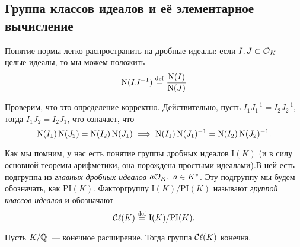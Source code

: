 	\subsection{Группа классов идеалов и её элементарное вычисление}

	Понятие нормы легко распространить на дробные идеалы: если $I, J \subset \mathcal{O}_{K}$~--- целые идеалы, то мы можем положить 
	\[
		\operatorname{\mathrm{N}}(I J^{-1}) \stackrel{\mathrm{def}}{=} \frac{\operatorname{\mathrm{N}}(I)}{\operatorname{\mathrm{N}}(J)} 
	\]

	Проверим, что это определение корректно. Действительно, пусть $I_1 J_1^{-1} = I_{2} J_{2}^{-1}$, тогда  $I_1 J_2 = I_2 J_1$, что означает, что 
	\[
		\operatorname{\mathrm{N}}(I_1)\operatorname{\mathrm{N}}(J_2) = \operatorname{\mathrm{N}}(I_2)\operatorname{\mathrm{N}}(J_1) \implies \operatorname{\mathrm{N}}(I_1)\operatorname{\mathrm{N}}(J_1)^{-1} = \operatorname{\mathrm{N}}(I_2) \operatorname{\mathrm{N}}(J_2)^{-1}.
	\]

	\begin{definition} 
		Как мы помним, у нас есть понятие группы дробных идеалов $\mathrm{I}(K)$ (и в силу основной теоремы арифметики, она порождена простыми идеалами).В ней есть подгруппа из \emph{главных дробных идеалов} $a\mathcal{O}_{K}, \ a \in K^{*}$.  Эту подгруппу мы будем обозначать, как $\mathrm{PI}(K)$. Факторгруппу $\mathrm{I}(K)/\mathrm{PI}(K)$ называют \emph{группой классов идеалов} и обозначают 
	\[
		\operatorname{\mathcal{C}\mathbf{\ell}}(K) \stackrel{\mathrm{def}}{=} \mathrm{I}(K)/\mathrm{PI}(K).
	\]
	\end{definition}

	


	\begin{theorem}\label{Cl(K)_is_finite} 
		Пусть $K/\mathbb{Q}$~--- конечное расширение. Тогда группа $\operatorname{\mathcal{C}\mathbf{\ell}}(K)$ конечна. 
	\end{theorem}

